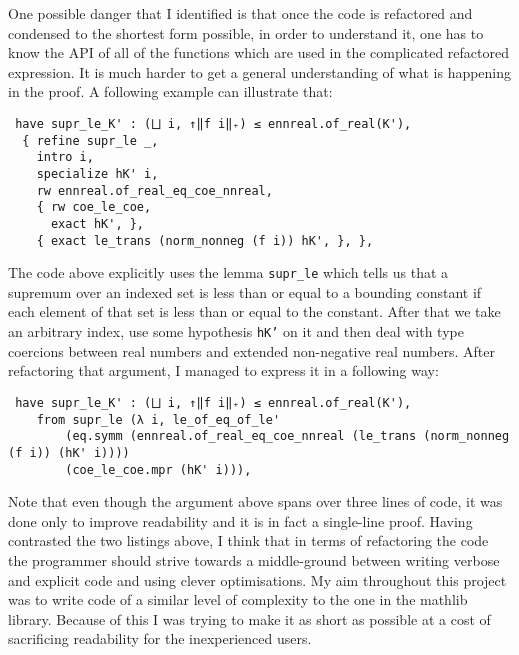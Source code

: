 \documentclass[11pt]{article}
\newenvironment{code}{\captionsetup{type=listing}}{}
\begin{document}
One possible danger that I identified is that once the code is refactored and
condensed to the shortest form possible, in order to understand it, one has to
know the API of all of the functions which are used in the complicated refactored
expression. It is much harder to get a general understanding of what is happening
in the proof. A following example can illustrate that:
\begin{code}
\begin{verbatim}
 have supr_le_K' : (⨆ i, ↑‖f i‖₊) ≤ ennreal.of_real(K'),
  { refine supr_le _,
    intro i,
    specialize hK' i,
    rw ennreal.of_real_eq_coe_nnreal,
    { rw coe_le_coe,
      exact hK', },
    { exact le_trans (norm_nonneg (f i)) hK', }, },
\end{verbatim}
\end{code}
The code above explicitly uses the lemma \texttt{supr\_le} which tells us that
a supremum over an indexed set is less than or equal to a bounding constant if each element
of that set is less than or equal to the constant. After that we take an arbitrary
index, use some hypothesis \texttt{hK'} on it and then deal with type coercions
between real numbers and extended non-negative real numbers. After refactoring that
argument, I managed to express it in a following way:
\begin{code}
\begin{verbatim}
 have supr_le_K' : (⨆ i, ↑‖f i‖₊) ≤ ennreal.of_real(K'),
    from supr_le (λ i, le_of_eq_of_le'
        (eq.symm (ennreal.of_real_eq_coe_nnreal (le_trans (norm_nonneg (f i)) (hK' i))))
        (coe_le_coe.mpr (hK' i))),
\end{verbatim}
\end{code}

Note that even though the argument above spans over three lines of code, it was
done only to improve readability and it is in fact a single-line proof. Having
contrasted the two listings above, I think that in terms of refactoring the code the
programmer should strive towards a middle-ground between writing verbose and explicit code
and using clever optimisations. My aim throughout this project was to write
code of a similar level of complexity to the one in the mathlib library. Because of
this I was trying to make it as short as possible at a cost of sacrificing readability
for the inexperienced users.
\end{document}
